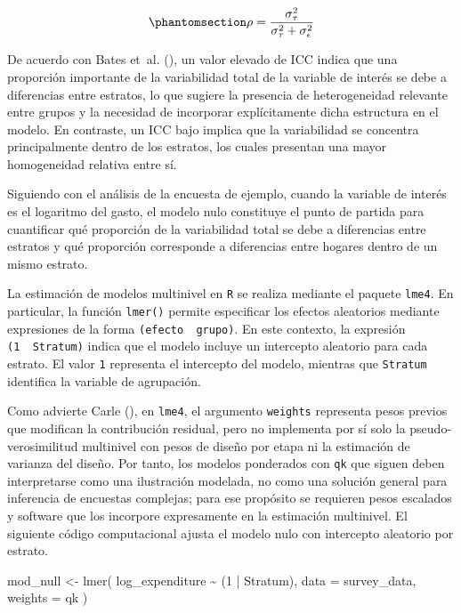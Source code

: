 \documentclass[
  spanish,
  11pt,
  letterpaper,
  oneside,
  open=any]{scrbook}
\newenvironment{Shaded}{\begin{snugshade}}{\end{snugshade}}
\newcommand{\AttributeTok}[1]{\textcolor[rgb]{0.40,0.45,0.13}{#1}}
\newcommand{\DecValTok}[1]{\textcolor[rgb]{0.68,0.00,0.00}{#1}}
\newcommand{\FunctionTok}[1]{\textcolor[rgb]{0.28,0.35,0.67}{#1}}
\newcommand{\NormalTok}[1]{\textcolor[rgb]{0.00,0.23,0.31}{#1}}
\newcommand{\OtherTok}[1]{\textcolor[rgb]{0.00,0.23,0.31}{#1}}
\newcommand{\SpecialCharTok}[1]{\textcolor[rgb]{0.37,0.37,0.37}{#1}}
\begin{document}
\begin{equation}\protect\phantomsection\label{eq-cci-lineal}{
\rho = \frac{\sigma_{\tau}^{2}}{\sigma_{\tau}^{2} + \sigma_{\epsilon}^{2}}
}\end{equation}

De acuerdo con Bates et~al. (), un
valor elevado de ICC indica que una proporción importante de la
variabilidad total de la variable de interés se debe a diferencias entre
estratos, lo que sugiere la presencia de heterogeneidad relevante entre
grupos y la necesidad de incorporar explícitamente dicha estructura en
el modelo. En contraste, un ICC bajo implica que la variabilidad se
concentra principalmente dentro de los estratos, los cuales presentan
una mayor homogeneidad relativa entre sí.

Siguiendo con el análisis de la encuesta de ejemplo, cuando la variable
de interés es el logaritmo del gasto, el modelo nulo constituye el punto
de partida para cuantificar qué proporción de la variabilidad total se
debe a diferencias entre estratos y qué proporción corresponde a
diferencias entre hogares dentro de un mismo estrato.

La estimación de modelos multinivel en \texttt{R} se realiza mediante el
paquete \texttt{lme4}. En particular, la función \texttt{lmer()} permite
especificar los efectos aleatorios mediante expresiones de la forma
\texttt{(efecto\ \textbar{}\ grupo)}. En este contexto, la expresión
\texttt{(1\ \textbar{}\ Stratum)} indica que el modelo incluye un
intercepto aleatorio para cada estrato. El valor \texttt{1} representa
el intercepto del modelo, mientras que \texttt{Stratum} identifica la
variable de agrupación.

Como advierte Carle (), en \texttt{lme4},
el argumento \texttt{weights} representa pesos previos que modifican la
contribución residual, pero no implementa por sí solo la
pseudo-verosimilitud multinivel con pesos de diseño por etapa ni la
estimación de varianza del diseño. Por tanto, los modelos ponderados con
\texttt{qk} que siguen deben interpretarse como una ilustración
modelada, no como una solución general para inferencia de encuestas
complejas; para ese propósito se requieren pesos escalados y software
que los incorpore expresamente en la estimación multinivel. El siguiente
código computacional ajusta el modelo nulo con intercepto aleatorio por
estrato.

\begin{Shaded}
\begin{Highlighting}[]
\NormalTok{mod\_null }\OtherTok{\textless{}{-}} \FunctionTok{lmer}\NormalTok{(}
\NormalTok{  log\_expenditure }\SpecialCharTok{\textasciitilde{}}\NormalTok{ (}\DecValTok{1} \SpecialCharTok{|}\NormalTok{ Stratum),}
  \AttributeTok{data =}\NormalTok{ survey\_data,}
  \AttributeTok{weights =}\NormalTok{ qk}
\NormalTok{)}
\end{Highlighting}
\end{Shaded}
\end{document}
